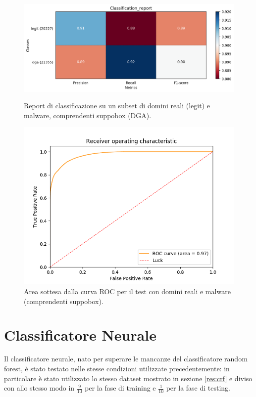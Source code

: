 \begin{figure}[!ht]
    \centering
    \includegraphics[width=\columnwidth]{figures/rndf_tra_sup_sup/class_rep.png}
    \caption{Report di classificazione su un subset di domini reali (legit) e malware, comprendenti suppobox (DGA).\label{fig:repall}}

    \centering
    \includegraphics[width=\columnwidth]{figures/rndf_tra_sup_sup/roc_plot.png}
    \caption{Area sottesa dalla curva ROC per il test con domini reali e malware (comprendenti suppobox).\label{fig:rocall}}
\end{figure}

\section{Classificatore Neurale}
Il classificatore neurale, nato per superare le mancanze del classificatore random forest, è stato testato nelle stesse condizioni utilizzate precedentemente: in particolare è stato utilizzato lo stesso dataset mostrato in sezione \ref{res:crf} e diviso con allo stesso modo in $\frac{9}{10}$ per la fase di training e $\frac{1}{10}$ per la fase di testing.

